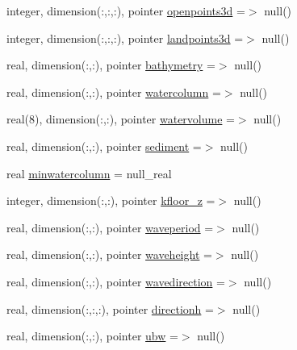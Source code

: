 \begin{DoxyCompactItemize}
\item 
integer, dimension(\+:,\+:,\+:), pointer \mbox{\hyperlink{structmoduleinterfacesedimentwater_1_1t__ext__water_adf2f1a19a3fb8670dbc88c5f7d866f91}{openpoints3d}} =$>$ null()
\item 
integer, dimension(\+:,\+:,\+:), pointer \mbox{\hyperlink{structmoduleinterfacesedimentwater_1_1t__ext__water_a5218a24f175edb03d66ccc8d1c02873a}{landpoints3d}} =$>$ null()
\item 
real, dimension(\+:,\+:), pointer \mbox{\hyperlink{structmoduleinterfacesedimentwater_1_1t__ext__water_a27b54d1dd988ad4bdafb746eee6df366}{bathymetry}} =$>$ null()
\item 
real, dimension(\+:,\+:), pointer \mbox{\hyperlink{structmoduleinterfacesedimentwater_1_1t__ext__water_aea742afe40c755f5ef77e556cc4b6132}{watercolumn}} =$>$ null()
\item 
real(8), dimension(\+:,\+:), pointer \mbox{\hyperlink{structmoduleinterfacesedimentwater_1_1t__ext__water_a535e26d9dd6c745e4fa58368a08c84fb}{watervolume}} =$>$ null()
\item 
real, dimension(\+:,\+:), pointer \mbox{\hyperlink{structmoduleinterfacesedimentwater_1_1t__ext__water_a3777d51daa1b467be085e81106f3d6ab}{sediment}} =$>$ null()
\item 
real \mbox{\hyperlink{structmoduleinterfacesedimentwater_1_1t__ext__water_af923a103457a260eedbc1bf98e7e1c67}{minwatercolumn}} = null\+\_\+real
\item 
integer, dimension(\+:,\+:), pointer \mbox{\hyperlink{structmoduleinterfacesedimentwater_1_1t__ext__water_ab68c22d042e429ea5a6450c9410e0f46}{kfloor\+\_\+z}} =$>$ null()
\item 
real, dimension(\+:,\+:), pointer \mbox{\hyperlink{structmoduleinterfacesedimentwater_1_1t__ext__water_abe80b05620c202676103a26b2d1de151}{waveperiod}} =$>$ null()
\item 
real, dimension(\+:,\+:), pointer \mbox{\hyperlink{structmoduleinterfacesedimentwater_1_1t__ext__water_a49842538313705cad7b4a171f04ac907}{waveheight}} =$>$ null()
\item 
real, dimension(\+:,\+:), pointer \mbox{\hyperlink{structmoduleinterfacesedimentwater_1_1t__ext__water_ac1754b42d067d9c7624c2e3c34678d55}{wavedirection}} =$>$ null()
\item 
real, dimension(\+:,\+:,\+:), pointer \mbox{\hyperlink{structmoduleinterfacesedimentwater_1_1t__ext__water_a4c4de1d6c2989656ce12901c272c9ef2}{directionh}} =$>$ null()
\item 
real, dimension(\+:,\+:), pointer \mbox{\hyperlink{structmoduleinterfacesedimentwater_1_1t__ext__water_a6931baa9a9de23555930a11b5d868bc3}{ubw}} =$>$ null()

\end{DoxyCompactItemize}
